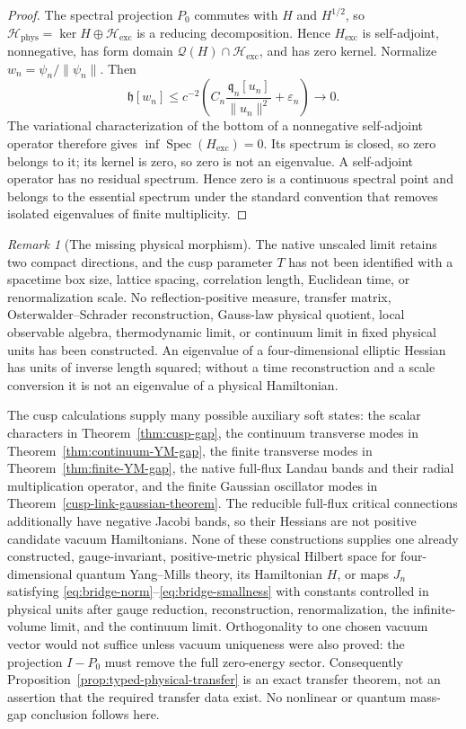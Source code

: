 \documentclass[11pt]{article}
\numberwithin{equation}{section}
\theoremstyle{definition}
\theoremstyle{remark}
\newtheorem{remark}[theorem]{Remark}
\newcommand{\Spec}{\operatorname{Spec}}
\begin{document}
\begin{proof}
The spectral projection $P_0$ commutes with $H$ and $H^{1/2}$, so
$\mathcal H_{\mathrm{phys}}=\ker H\oplus\mathcal H_{\mathrm{exc}}$ is a
reducing decomposition.  Hence $H_{\mathrm{exc}}$ is self-adjoint,
nonnegative, has form domain
$\mathcal Q(H)\cap\mathcal H_{\mathrm{exc}}$, and has zero kernel.  Normalize
$w_n=\psi_n/\|\psi_n\|$.  Then
\[
 \mathfrak h[w_n]
 \le c^{-2}\left(
 C_n\frac{\mathfrak q_n[u_n]}{\|u_n\|^2}+\varepsilon_n\right)
 \longrightarrow0.
\]
The variational characterization of the bottom of a nonnegative
self-adjoint operator therefore gives
$\inf\Spec(H_{\mathrm{exc}})=0$.  Its spectrum is closed, so zero belongs to
it; its kernel is zero, so zero is not an eigenvalue.  A self-adjoint operator
has no residual spectrum.  Hence zero is a continuous spectral point and
belongs to the essential spectrum under the standard convention that removes
isolated eigenvalues of finite multiplicity.
\end{proof}

\begin{remark}[The missing physical morphism]
The native unscaled limit retains two compact directions, and the cusp
parameter $T$ has not been identified with a spacetime box size, lattice
spacing, correlation length, Euclidean time, or renormalization scale.  No
reflection-positive measure, transfer matrix, Osterwalder--Schrader
reconstruction, Gauss-law physical quotient, local observable algebra,
thermodynamic limit, or continuum limit in fixed physical units has been
constructed.  An eigenvalue of a four-dimensional elliptic Hessian has units
of inverse length squared; without a time reconstruction and a scale
conversion it is not an eigenvalue of a physical Hamiltonian.

The cusp calculations supply many possible auxiliary soft states: the scalar
characters in Theorem~\ref{thm:cusp-gap}, the continuum transverse modes in
Theorem~\ref{thm:continuum-YM-gap}, the finite transverse modes in
Theorem~\ref{thm:finite-YM-gap}, the native full-flux Landau bands and their
radial multiplication operator, and the finite Gaussian oscillator modes in
Theorem~\ref{cusp-link-gaussian-theorem}.  The reducible full-flux critical
connections additionally have negative Jacobi bands, so their Hessians are
not positive candidate vacuum Hamiltonians.  None of these constructions
supplies one already constructed, gauge-invariant, positive-metric physical
Hilbert space for four-dimensional quantum Yang--Mills theory, its Hamiltonian
$H$, or maps $J_n$ satisfying
\eqref{eq:bridge-norm}--\eqref{eq:bridge-smallness} with constants controlled
in physical units after gauge reduction, reconstruction, renormalization,
the infinite-volume limit, and the continuum limit.  Orthogonality to one
chosen vacuum vector would not suffice unless vacuum uniqueness were also
proved: the projection $I-P_0$ must remove the full zero-energy sector.
Consequently Proposition~\ref{prop:typed-physical-transfer} is an exact
transfer theorem, not an assertion that the required transfer data exist.
No nonlinear or quantum mass-gap conclusion follows here.
\end{remark}
\end{document}
